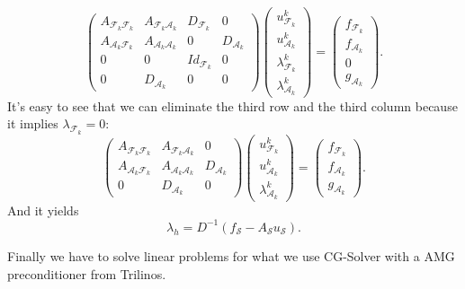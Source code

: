 \documentclass{article}
\begin{document}
\begin{equation}
\begin{pmatrix}
 A_{\mathcal{F}_k\mathcal{F}_k} & A_{\mathcal{F}_k\mathcal{A}_k} & D_{\mathcal{F}_k} & 0\\
 A_{\mathcal{A}_k\mathcal{F}_k} & A_{\mathcal{A}_k\mathcal{A}_k} & 0 & D_{\mathcal{A}_k}\\
 0 & 0 & Id_{\mathcal{F}_k} & 0\\
 0 & D_{\mathcal{A}_k} & 0 & 0
\end{pmatrix}
\begin{pmatrix}
 u^k_{\mathcal{F}_k}\\ u^k_{\mathcal{A}_k}\\ \lambda^k_{\mathcal{F}_k}\\ \lambda^k_{\mathcal{A}_k}
\end{pmatrix}
=
\begin{pmatrix}
 f_{\mathcal{F}_k}\\ f_{\mathcal{A}_k}\\ 0\\ g_{\mathcal{A}_k}
\end{pmatrix}.
\end{equation}
It's easy to see that we can eliminate the third row and the third column because it implies $\lambda_{\mathcal{F}_k} = 0$:
\begin{equation}
\begin{pmatrix}
 A_{\mathcal{F}_k\mathcal{F}_k} & A_{\mathcal{F}_k\mathcal{A}_k} & 0\\
 A_{\mathcal{A}_k\mathcal{F}_k} & A_{\mathcal{A}_k\mathcal{A}_k} & D_{\mathcal{A}_k}\\
 0 & D_{\mathcal{A}_k} & 0
\end{pmatrix}
\begin{pmatrix}
 u^k_{\mathcal{F}_k}\\ u^k_{\mathcal{A}_k}\\ \lambda^k_{\mathcal{A}_k}
\end{pmatrix}
=
\begin{pmatrix}
 f_{\mathcal{F}_k}\\ f_{\mathcal{A}_k}\\ g_{\mathcal{A}_k}
\end{pmatrix}.
\end{equation}
And it yields
\begin{equation}
 \lambda_h = D^{-1}\left(f_{\mathcal{S}} - A_{\mathcal{S}}u_{\mathcal{S}}\right).
\end{equation}


Finally we have to solve linear problems for what we use CG-Solver with a AMG preconditioner from Trilinos.
\end{document}
